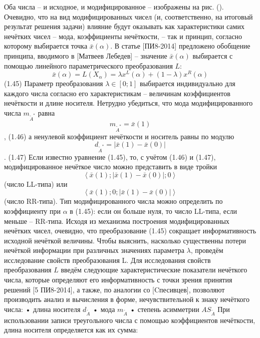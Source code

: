 Оба числа – и исходное, и модифицированное – изображены на рис. ().
Очевидно, что на вид модифицированных чисел (и, соответственно, на итоговый результат решения задачи) влияние будут оказывать как характеристики самих нечётких чисел – мода, коэффициенты нечёткости, – так и принцип, согласно которому выбирается точка $\bar{x}\left( \alpha  \right)$. В статье [ПИ8-2014] предложено обобщение принципа, вводимого в [Матвеев Лебедев] – значение $\bar{x}\left( \alpha  \right)$ выбирается с помощью линейного параметрического преобразования $L$:
	\[\bar{x}\left( \alpha  \right)=L\left( {{X}_{\alpha }} \right)=\lambda {{x}^{L}}\left( \alpha  \right)+\left( 1-\lambda  \right){{x}^{R}}\left( \alpha  \right)\] 	(1.45)
Параметр преобразования $\lambda \in \left[ 0;1 \right]$ выбирается индивидуально для каждого числа согласно его характеристикам – величинам коэффициентов нечёткости и длине носителя. Нетрудно убедиться, что мода модифицированного числа ${{m}_{{{{\tilde{A}}}^{*}}}}$ равна
	\[{{m}_{{{{\tilde{A}}}^{*}}}}=\bar{x}\left( 1 \right)\],	(1.46)
а ненулевой коэффициент нечёткости и носитель равны по модулю
	\[{{d}_{{{{\tilde{A}}}^{*}}}}=\left| \bar{x}\left( 1 \right)-\bar{x}\left( 0 \right) \right|\].	(1.47)
Если известно уравнение (1.45), то, с учётом (1.46) и (1.47), модифицированное нечёткое число можно представить в виде тройки \[\left\langle \bar{x}\left( 1 \right);\left| \bar{x}\left( 1 \right)-\bar{x}\left( 0 \right) \right|;0 \right\rangle \] (число LL-типа) или \[\left\langle \bar{x}\left( 1 \right);0;\left| \bar{x}\left( 1 \right)-\bar{x}\left( 0 \right) \right| \right\rangle \] (число RR-типа). Тип модифицированного числа можно определить по коэффициенту при $\alpha $ в (1.45): если он больше нуля, то число LL-типа, если меньше – RR-типа.
Исходя из механизма построения модифицированных нечётких чисел, очевидно, что преобразование (1.45) сокращает информативность исходной нечёткой величины. Чтобы выяснить, насколько существенны потери нечёткой информации при различных значениях параметра $\lambda $, проведём исследование свойств преобразования L.
Для исследования свойств преобразования $L$ введём следующие характеристические показатели нечёткого числа, которые определяют его информативность с точки зрения принятия решений [5 ПИ8-2014], а также, по аналогии со [Cпесивцев], позволяют производить анализ и вычисления в форме, нечувствительной к знаку нечёткого числа:
•	длина носителя ${{d}_{{\tilde{A}}}}$ 
•	мода ${{m}_{{\tilde{A}}}}$ 
•	степень асимметрии $A{{S}_{{\tilde{A}}}}$
При использовании записи треугольного числа с помощью коэффициентов нечёткости, длина носителя определяется как их сумма:

